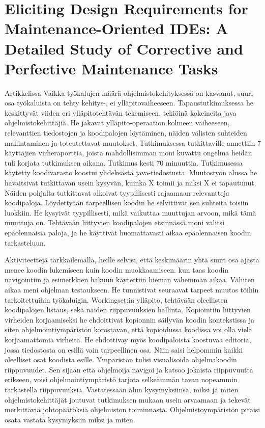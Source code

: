 \documentclass[finnish]{../tktltiki2}
\theoremstyle{definition}
\theoremstyle{remark}
\begin{document}
\section{Eliciting Design Requirements for Maintenance-Oriented IDEs: A Detailed Study of Corrective and Perfective Maintenance Tasks}
Artikkelissa \cite{eliciting-design-requirements-for-maintenance-oriented-ides}
Vaikka työkalujen määrä ohjelmistokehityksessä on kasvanut, suuri osa työkaluista on tehty kehitys-, ei ylläpitovaiheeseen. Tapaustutkimuksessa he keskittyvät viiden eri ylläpitotehtävän tekemiseen, tekiöinä kokeineita java ohjelmistokehittäjiä.
He jakavat ylläpito-operaation kolmeen vaiheeseen, relevanttien tiedostojen ja koodipalojen löytäminen, näiden välisten suhteiden mallintaminen ja toteutettavat muutokset.
Tutkimuksessa tutkittaville annettiin 7 käyttäjien virheraporttia, joista mahdollisimman moni kuvattu ongelma heidän tuli korjata tutkimuksen aikana. Tutkimus kesti 70 minuuttia.
Tutkimusessa käytetty koodivarasto koostui yhdeksästä java-tiedostusta.
Muutostyön alussa he havaitsivat tutkittavan usein kysyvän, kuinka X toimii ja miksi X ei tapautunut. Näiden pohjalta tutkittavat alkoivat tyypillisesti rajaamaan relevantteja koodipaloja.
Löydettyään tarpeellisen koodin he selvittivät sen suhteita toisiin luokkiin. He kysyivät tyypillisesti, mikä vaikuttaa muuttujan arvoon, mikä tämä muuttuja on.
Tehtävään liittyvien koodipalojen etsinnässä moni valitsi epäolennaisia paloja, ja he käyttivät huomattavasti aikaa epäolennaisen koodin tarkasteluun.

Aktiviteettejä tarkkailemalla, heille selvisi, että keskimäärin yhtä suuri osa ajasta menee koodin lukemiseen kuin koodin muokkaamiseen. kun taas koodin navigointiin ja esimerkkien hakuun käytettiin hieman vähemmän aikaa. Vähiten aikaa meni ohjelman testaukseen.
He tunnistivat seuraavat tarpeet muutos töihin tarkoitettuihin työkaluigin.
Workingset:in ylläpito, tehtävään oleellisten koodipalojen listaus, sekä näiden riippuvuuksien hallinta. Kopiointiin liittyvien virheiden korjaamiseksi he ehdoittivat kopionnin säilyvän koodin kontekstissa ja siten ohjelmointiympäristön korostavan, että kopioidussa koodissa voi olla vielä korjaamattomia virheitä.
He ehdottivay myös koodipaloista koostuvaa editoria, jossa tiedostosta on esillä vain tarpeellinen osa. Näin saisi helpommin kaikki oleelliset osat koodista esille.
Ympäristön tulisi visualisoida ohjelmakoodin riippuvuudet. Sen sijaan että ohjelmoija navigoi ja katsoo jokaista riippuvuutta erikseen, voisi ohjelmointiympäristö tarjota selkeämmän tavan nopeammin tarkastella riippuvuuksia.
Vastatessaan alun kysymyksiinsä, miksi ja miten ohjelmistokehittäjät joutuvat tutkimuksen mukaan usein arvaamaan ja tekevät merkittäviä johtopäätöksiä ohjelmiston toiminnasta. Ohjelmistoympäristön pitäisi osata vastata kysymyksiin miksi ja miten. %





\end{document}
